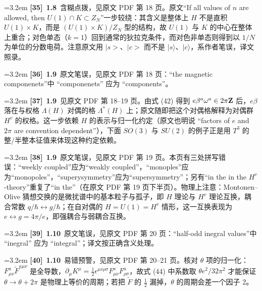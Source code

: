 \par
\par\medskip\noindent\hangindent=3.2em \textbf{[35]}~\textbf{1.8}~含糊点拨，见原文 PDF 第 18 页。原文“If all values of $n$ are allowed, then $U(1)\cap K\subset Z_N$”一步较绕：其含义是整体上 $H$ 不是直积 $U(1)\times K$，而是 $(U(1)\times K)/Z_N$ 型的结构，故 $U(1)$ 与 $K$ 的中心在整体上重合；对色单态（$k=1$）回到通常的狄拉克条件，而对色非单态则得到以 $1/N$ 为单位的分数电荷。注意原文用 $|s>$、$|c>$ 而不是 $|s\rangle$、$|c\rangle$，系作者笔误，译文照录。
\par
\par\medskip\noindent\hangindent=3.2em \textbf{[36]}~\textbf{1.9}~原文笔误，见原文 PDF 第 18 页：“the magnetic componenets”中 “componenets” 应为 “components”。
\par
\par\medskip\noindent\hangindent=3.2em \textbf{[37]}~\textbf{1.9}~见原文 PDF 第 18–19 页。由式 (42) 得到 $e\beta^a\omega^a\in2\pi{\bf Z}$ 后，$e\beta$ 落在与权格 $\Lambda(H)$ 对偶的格 $\Lambda^*(H)$ 上；原文随即把这个对偶格解释为对偶群 $H^v$ 的权格。这一步依赖 $H$ 的表示与归一化约定（原文也明说 “factors of $e$ and $2\pi$ are convention dependent”），下面 $SO(3)$ 与 $SU(2)$ 的例子正是用 $T^3$ 的整/半整本征值来体现这种约定依赖。
\par
\par\medskip\noindent\hangindent=3.2em \textbf{[38]}~\textbf{1.9}~原文笔误，见原文 PDF 第 19 页。本页有三处拼写错误：“weekly coupled”应为“weakly coupled”，“monoples”应为“monopoles”，“superysymmetry”应为“supersymmetry”；另有“in the in the $H^v$-theory”重复了“in the”（在原文 PDF 第 19 页下半页）。物理上注意：Montonen–Olive 猜想交换的是微扰谱中的基本粒子与孤子，即 $H$ 理论与 $H^v$ 理论互换，耦合常数 $q/\hbar\leftrightarrow g/\hbar$；在自对偶的 $H=U(1)=H^v$ 情形，这一互换表现为 $e\leftrightarrow g=4\pi/e$，即强耦合与弱耦合互换。
\par
\par\medskip\noindent\hangindent=3.2em \textbf{[39]}~\textbf{1.10}~原文笔误，见原文 PDF 第 20 页：“half-odd inegral values”中 “inegral” 应为 “integral”；译文按正确含义处理。
\par
\par\medskip\noindent\hangindent=3.2em \textbf{[40]}~\textbf{1.10}~易错预警，见原文 PDF 第 20–21 页。核对 $\theta$ 项的归一化：$F^a_{\mu\nu}\tilde F^{a\mu\nu}$ 是全导数，$\partial_\mu K^\mu=\frac12\epsilon^{\mu\nu\rho\sigma}F^a_{\mu\nu}F^a_{\rho\sigma}$，故式 (44) 中系数取 $\theta e^2/32\pi^2$ 才能保证 $\theta\to\theta+2\pi$ 是物理上等价的周期；若把 $\tilde F$ 的 $\frac12$ 漏掉，$\theta$ 的周期会差一个因子 2。
